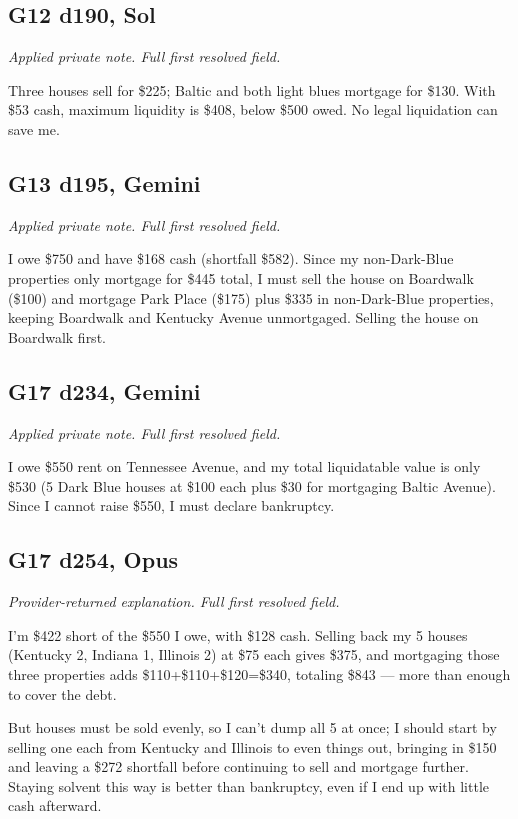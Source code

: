 \subsection*{G12 d190, Sol}
{\small\textit{Applied private note. Full first resolved field.}\par Three houses sell for \$225; Baltic and both light blues mortgage for \$130. With \$53 cash, maximum liquidity is \$408, below \$500 owed. No legal liquidation can save me.\par}
\subsection*{G13 d195, Gemini}
{\small\textit{Applied private note. Full first resolved field.}\par I owe \$750 and have \$168 cash (shortfall \$582). Since my non-Dark-Blue properties only mortgage for \$445 total, I must sell the house on Boardwalk (\$100) and mortgage Park Place (\$175) plus \$335 in non-Dark-Blue properties, keeping Boardwalk and Kentucky Avenue unmortgaged. Selling the house on Boardwalk first.\par}
\subsection*{G17 d234, Gemini}
{\small\textit{Applied private note. Full first resolved field.}\par I owe \$550 rent on Tennessee Avenue, and my total liquidatable value is only \$530 (5 Dark Blue houses at \$100 each plus \$30 for mortgaging Baltic Avenue). Since I cannot raise \$550, I must declare bankruptcy.\par}
\subsection*{G17 d254, Opus}
{\small\textit{Provider-returned explanation. Full first resolved field.}\par I'm \$422 short of the \$550 I owe, with \$128 cash. Selling back my 5 houses (Kentucky 2, Indiana 1, Illinois 2) at \$75 each gives \$375, and mortgaging those three properties adds \$110+\$110+\$120=\$340, totaling \$843 — more than enough to cover the debt.

But houses must be sold evenly, so I can't dump all 5 at once; I should start by selling one each from Kentucky and Illinois to even things out, bringing in \$150 and leaving a \$272 shortfall before continuing to sell and mortgage further. Staying solvent this way is better than bankruptcy, even if I end up with little cash afterward.\par}
